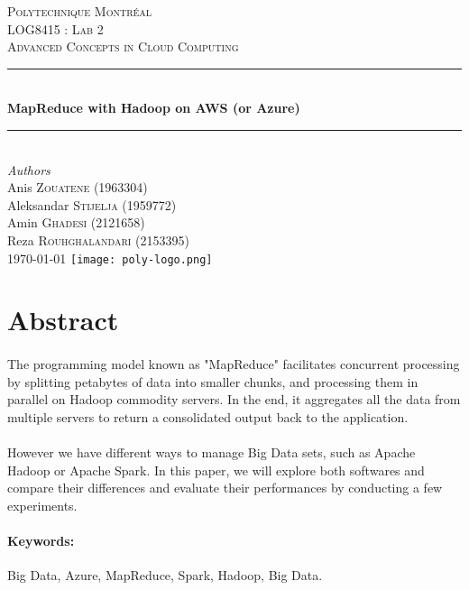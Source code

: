 \documentclass[12pt]{article}
\begin{document}
\begin{titlepage} 
	\newcommand{\HRule}{\rule{\linewidth}{0.5mm}}
	\center
	\textsc{\LARGE Polytechnique Montréal}\\[1.5cm]
	\textsc{\Large LOG8415 : Lab 2}\\[0.5cm]
	\textsc{\large Advanced Concepts in Cloud Computing}\\[0.5cm]
	\HRule\\[0.4cm]
	{\huge\bfseries MapReduce with Hadoop on AWS (or Azure)}\\[0.4cm]
	\HRule\\[1.5cm]
	{\large\textit{Authors}}\\
	Anis \textsc{Zouatene} (1963304)\\
	Aleksandar \textsc{Stijelja} (1959772)\\
	Amin \textsc{Ghadesi} (2121658)\\
    Reza \textsc{Rouhghalandari} (2153395)\\
	\vfill\vfill\vfill {\large\today} \vfill\vfill
	\texttt{[image: poly-logo.png]}\\[1cm]
	\vfill
\end{titlepage}


\section{Abstract}
	\paragraph{} The programming model known as "MapReduce" facilitates concurrent processing by splitting 
	petabytes of data into smaller chunks, and processing them in parallel on Hadoop commodity servers. 
	In the end, it aggregates all the data from multiple servers to return a consolidated output back to 
	the application.
		
	\paragraph{} However we have different ways to manage Big Data sets, such as Apache Hadoop or Apache 
	Spark. In this paper, we will explore both softwares and compare their differences and evaluate their 
	performances by conducting a few experiments.

	\paragraph{Keywords:}Big Data, Azure, MapReduce, Spark, Hadoop, Big Data.
	\pagebreak
\end{document}
